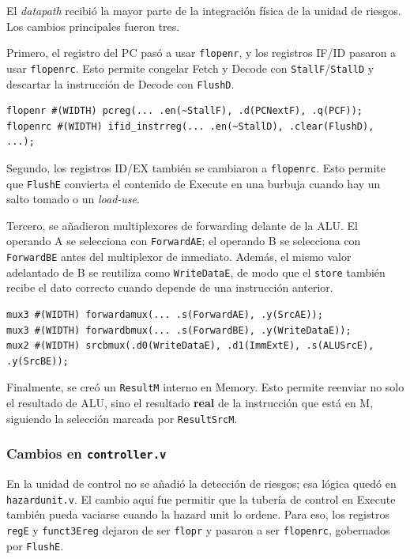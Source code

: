 \documentclass[11pt,a4paper]{article}
\begin{document}
El \textit{datapath} recibió la mayor parte de la integración física de la unidad de
riesgos. Los cambios principales fueron tres.

Primero, el registro del PC pasó a usar \texttt{flopenr}, y los registros IF/ID pasaron
a usar \texttt{flopenrc}. Esto permite congelar Fetch y Decode con
\texttt{StallF}/\texttt{StallD} y descartar la instrucción de Decode con
\texttt{FlushD}.

\begin{lstlisting}
flopenr #(WIDTH) pcreg(... .en(~StallF), .d(PCNextF), .q(PCF));
flopenrc #(WIDTH) ifid_instrreg(... .en(~StallD), .clear(FlushD), ...);
\end{lstlisting}

Segundo, los registros ID/EX también se cambiaron a \texttt{flopenrc}. Esto permite que
\texttt{FlushE} convierta el contenido de Execute en una burbuja cuando hay un salto
tomado o un \textit{load-use}.

Tercero, se añadieron multiplexores de forwarding delante de la ALU. El operando A se
selecciona con \texttt{ForwardAE}; el operando B se selecciona con
\texttt{ForwardBE} antes del multiplexor de inmediato. Además, el mismo valor adelantado
de B se reutiliza como \texttt{WriteDataE}, de modo que el \texttt{store} también recibe
el dato correcto cuando depende de una instrucción anterior.

\begin{lstlisting}
mux3 #(WIDTH) forwardamux(... .s(ForwardAE), .y(SrcAE));
mux3 #(WIDTH) forwardbmux(... .s(ForwardBE), .y(WriteDataE));
mux2 #(WIDTH) srcbmux(.d0(WriteDataE), .d1(ImmExtE), .s(ALUSrcE), .y(SrcBE));
\end{lstlisting}

Finalmente, se creó un \texttt{ResultM} interno en Memory. Esto permite reenviar no solo
el resultado de ALU, sino el resultado \textbf{real} de la instrucción que está en M,
siguiendo la selección marcada por \texttt{ResultSrcM}.

\subsubsection{Cambios en \texttt{controller.v}}

En la unidad de control no se añadió la detección de riesgos; esa lógica quedó en
\texttt{hazardunit.v}. El cambio aquí fue permitir que la tubería de control en Execute
también pueda vaciarse cuando la hazard unit lo ordene. Para eso, los registros
\texttt{regE} y \texttt{funct3Ereg} dejaron de ser \texttt{flopr} y pasaron a ser
\texttt{flopenrc}, gobernados por \texttt{FlushE}.
\end{document}
